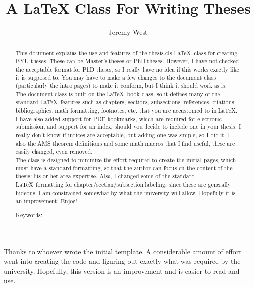\documentclass[12pt]{thesis}
\author{Jeremy West}
\title{A LaTeX Class For Writing Theses}
\begin{document}
\frontmatter
\maketitle  %

\begin{abstract} %

This document explains the use and features of the thesis.cls \LaTeX\ class for creating BYU theses. These can be Master's theses or PhD theses. However, I have not checked the acceptable format for PhD theses, so I really have no idea if this works exactly like it is supposed to. You may have to make a few changes to the document class (particularly the intro pages) to make it conform, but I think it should work as is.\\
	
The document class is built on the \LaTeX\ book class, so it defines many of the standard \LaTeX\ features such as chapters, sections, subsections, references, citations, bibliographies, math formatting, footnotes, etc. that you are accustomed to in \LaTeX. I have also added support for PDF bookmarks, which are required for electronic submission, and support for an index, should you decide to include one in your thesis. I really don't know if indices are acceptable, but adding one was simple, so I did it. I also the AMS theorem definitions and some math macros that I find useful, these are easily changed, even removed.\\
	
The class is designed to minimize the effort required to create the initial pages, which must have a standard formatting, so that the author can focus on the content of the thesis: his or her area expertise. Also, I changed some of the standard \LaTeX\ formatting for chapter/section/subsection labeling, since these are generally hideous. I am constrained somewhat by what the university will allow. Hopefully it is an improvement. Enjoy!
  \vskip 3.25in
 
\noindent Keywords: %
\end{abstract}


\begin{acknowledgments}
	Thanks to whoever wrote the initial template. A considerable amount of effort went into creating the code and figuring out exactly what was required by the university. Hopefully, this version is an improvement and is easier to read and use.
\end{acknowledgments}
\end{document}
